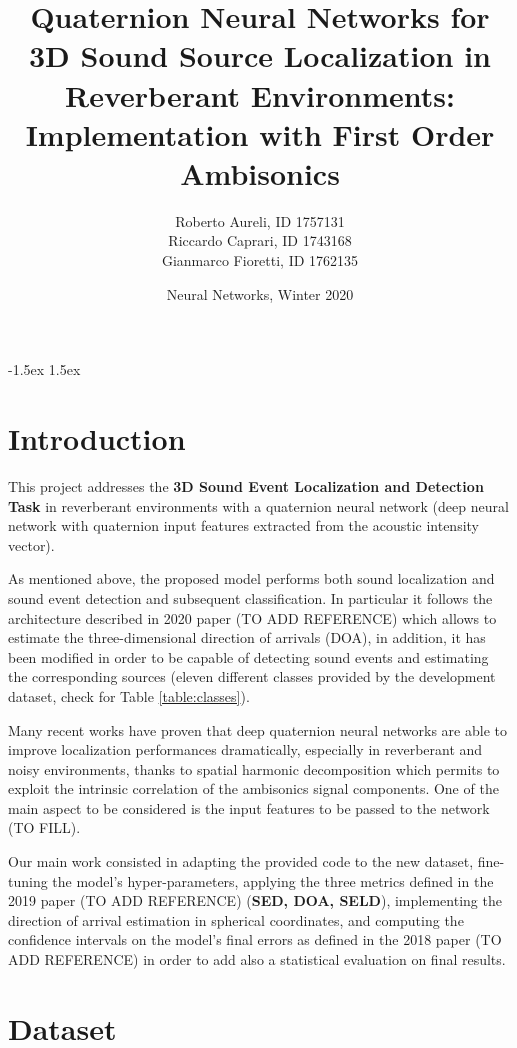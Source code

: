 \documentclass[11pt]{article}
\title{Quaternion Neural Networks for 3D Sound Source Localization in Reverberant Environments: Implementation with First Order Ambisonics}
\author{Roberto Aureli, ID 1757131\\
		Riccardo Caprari, ID 1743168\\
		Gianmarco Fioretti, ID 1762135}
\date{Neural Networks, Winter 2020}
\begin{document}
\maketitle

\vspace{10px}

\openup -1.5ex
\tableofcontents
\openup 1.5ex

\newpage
\section{Introduction}\label{cha:intro}

This project addresses the \textbf{3D Sound Event Localization and Detection Task} in reverberant environments with a  quaternion neural network (deep neural network with quaternion input features extracted from the acoustic intensity vector).\newline

As mentioned above, the proposed model performs both sound localization and sound event detection and subsequent classification. In particular it follows the architecture described in 2020 paper (TO ADD REFERENCE) which allows to estimate the three-dimensional direction of arrivals (DOA), in addition, it has been modified in order to be capable of detecting sound events and estimating the corresponding sources (eleven different classes provided by the development dataset, check for Table \ref{table:classes}).\newline

Many recent works have proven that deep quaternion neural networks are able to improve localization performances dramatically, especially in reverberant and noisy environments, thanks to spatial harmonic decomposition which permits to exploit the intrinsic correlation of the ambisonics signal components. One of the main aspect to be considered is the input features to be passed to the network (TO FILL).\newline

Our main work consisted in adapting the provided code to the new dataset, fine-tuning the model's hyper-parameters, applying the three metrics defined in the 2019 paper  (TO ADD REFERENCE) (\textbf{SED, DOA, SELD}), implementing the direction of arrival estimation in spherical coordinates, and computing the confidence intervals on the model's final errors as defined in the 2018 paper (TO ADD REFERENCE) in order to add also a statistical evaluation on final results.


\section{Dataset}\label{cha:data}
\end{document}
